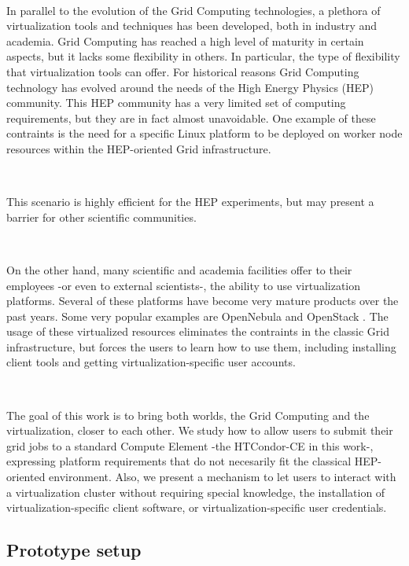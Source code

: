 \documentclass[a4paper]{jpconf}
\begin{document}
~

In parallel to the evolution of the Grid Computing technologies, a plethora of
virtualization tools and techniques has been developed, both in industry and academia.
Grid Computing has reached a high level of maturity in certain aspects, but it
lacks some flexibility in others.
In particular, the type of flexibility that virtualization tools can offer. 
For historical reasons Grid Computing technology has evolved around the needs of the High Energy Physics (HEP) community.
This HEP community has a very limited set of computing requirements, but they are in fact almost unavoidable. 
One example of these contraints is the need for a specific Linux
platform to be deployed on worker node resources within the HEP-oriented
Grid infrastructure.

~

This scenario is highly efficient for the HEP experiments, 
but may present a barrier for other scientific communities.

~

On the other hand, many scientific and academia facilities offer to their employees -or even to external scientists-,
the ability to use virtualization platforms. 
Several of these platforms have become very mature products over the past years.
Some very popular examples are OpenNebula \cite{opennebula} and OpenStack \cite{openstack}.
The usage of these virtualized resources eliminates the contraints in the
classic Grid infrastructure, but forces the users to learn how to use them,
including installing client tools and getting virtualization-specific
user accounts.

~

The goal of this work is to bring both worlds, the Grid Computing and the virtualization, closer to each other. 
We study how to allow users to submit their grid jobs to a standard Compute Element -the HTCondor-CE \cite{condorce} in this work-,
expressing platform requirements that do not necesarily fit the classical HEP-oriented environment.
Also, we present a mechanism to let users to interact with a virtualization cluster without requiring
special knowledge, the installation of virtualization-specific client software,
or virtualization-specific user credentials.

\subsection{Prototype setup} \label{prototype}

~
\end{document}
